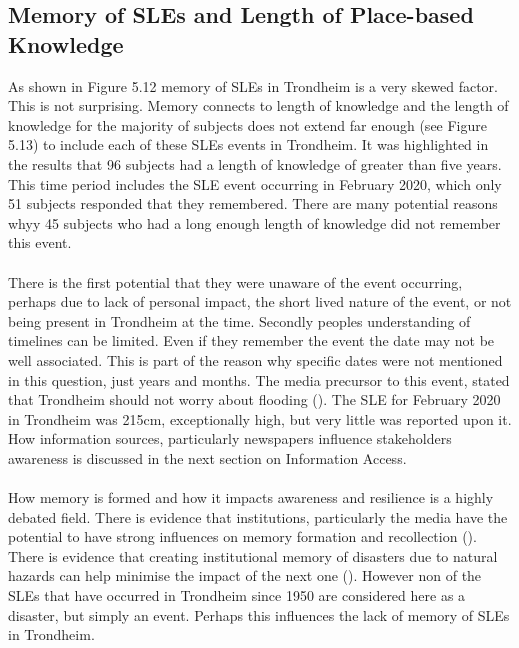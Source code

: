 \subsection{Memory of SLEs and Length of Place-based Knowledge}
As shown in Figure 5.12 memory of SLEs in Trondheim is a very skewed factor. This is not surprising. Memory connects to length of knowledge and the length of knowledge for the majority of subjects does not extend far enough (see Figure 5.13) to include each of these SLEs events in Trondheim. It was highlighted in the results that 96 subjects had a length of knowledge of greater than five years. This time period includes the SLE event occurring in February 2020, which only 51 subjects responded that they remembered. There are many potential reasons whyy 45 subjects who had a long enough length of knowledge did not remember this event. 
\paragraph{}
There is the first potential that they were unaware of the event occurring, perhaps due to lack of personal impact, the short lived nature of the event, or not being present in Trondheim at the time. Secondly peoples understanding of timelines can be limited. Even if they remember the event the date may not be well associated. This is part of the reason why specific dates were not mentioned in this question, just years and months. The media precursor to this event, stated that Trondheim should not worry about flooding (\cite{baisotti_danger_2020}). The SLE for February 2020 in Trondheim was 215cm, exceptionally high, but very little was reported upon it. How information sources, particularly newspapers influence stakeholders awareness is discussed in the next section on Information Access.
\paragraph{}
How memory is formed and how it impacts awareness and resilience is a highly debated field. There is evidence that institutions, particularly the media have the potential to have strong influences on memory formation and recollection (\cite{de_guttry_expiry_2022}). There is evidence that creating institutional memory of disasters due to natural hazards can help minimise the impact of the next one (\cite{de_guttry_expiry_2022}). However non of the SLEs that have occurred in Trondheim since 1950 are considered here as a disaster, but simply an event. Perhaps this influences the lack of memory of SLEs in Trondheim. 
